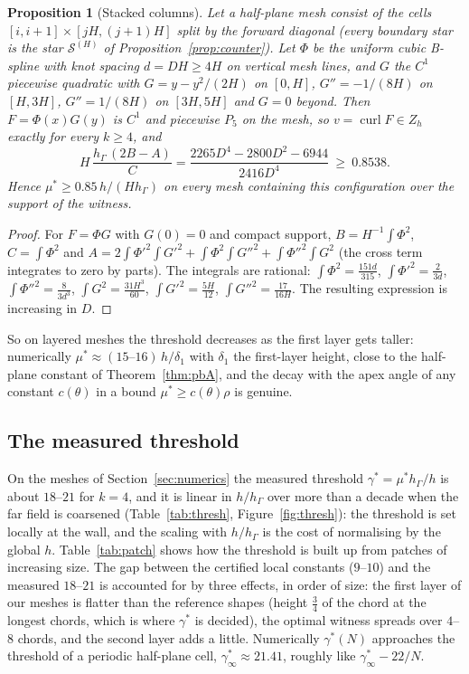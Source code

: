 \documentclass[pdflatex,sn-mathphys-num]{sn-jnl}
\theoremstyle{thmstyleone}
\newtheorem{proposition}[theorem]{Proposition}
\theoremstyle{thmstylethree}
\newcommand{\hG}{h_\Gamma}
\newcommand{\Zh}{Z_h}
\newcommand{\curl}{\operatorname{curl}}
\newcommand{\cS}{\mathcal S}
\begin{document}
\begin{proposition}[Stacked columns]\label{prop:cols}
Let a half-plane mesh consist of the cells $[i,i+1]\times[jH,(j+1)H]$ split by the forward diagonal (every boundary star is the star $\cS^{(H)}$ of Proposition~\ref{prop:counter}). Let $\Phi$ be the uniform cubic B-spline with knot spacing $d=DH\ge4H$ on vertical mesh lines, and $G$ the $C^1$ piecewise quadratic with $G=y-y^2/(2H)$ on $[0,H]$, $G''=-1/(8H)$ on $[H,3H]$, $G''=1/(8H)$ on $[3H,5H]$ and $G=0$ beyond. Then $F=\Phi(x)G(y)$ is $C^1$ and piecewise $P_5$ on the mesh, so $v=\curl F\in\Zh$ exactly for every $k\ge4$, and
\[
H\,\frac{\hG\,(2B-A)}{C}=\frac{2265D^4-2800D^2-6944}{2416D^4}\ \ge\ 0.8538 .
\]
Hence $\mu^\ast\ge0.85\,h/(H\hG)$ on every mesh containing this configuration over the support of the witness.
\end{proposition}

\begin{proof}
For $F=\Phi G$ with $G(0)=0$ and compact support, $B=H^{-1}\int\Phi^2$, $C=\int\Phi^2$ and $A=2\int\Phi'^2\int G'^2+\int\Phi^2\int G''^2+\int\Phi''^2\int G^2$ (the cross term integrates to zero by parts). The integrals are rational: $\int\Phi^2=\frac{151d}{315}$, $\int\Phi'^2=\frac2{3d}$, $\int\Phi''^2=\frac8{3d^3}$, $\int G^2=\frac{31H^3}{60}$, $\int G'^2=\frac{5H}{12}$, $\int G''^2=\frac{17}{16H}$. The resulting expression is increasing in $D$.
\end{proof}

So on layered meshes the threshold decreases as the first layer gets taller: numerically $\mu^\ast\approx(15\text{--}16)\,h/\delta_1$ with $\delta_1$ the first-layer height, close to the half-plane constant of Theorem~\ref{thm:pbA}, and the decay with the apex angle of any constant $c(\theta)$ in a bound $\mu^\ast\ge c(\theta)\rho$ is genuine.

\subsection{The measured threshold}
On the meshes of Section~\ref{sec:numerics} the measured threshold $\gamma^\ast=\mu^\ast\hG/h$ is about $18$--$21$ for $k=4$, and it is linear in $h/\hG$ over more than a decade when the far field is coarsened (Table~\ref{tab:thresh}, Figure~\ref{fig:thresh}): the threshold is set locally at the wall, and the scaling with $h/\hG$ is the cost of normalising by the global $h$. Table~\ref{tab:patch} shows how the threshold is built up from patches of increasing size. The gap between the certified local constants ($9$--$10$) and the measured $18$--$21$ is accounted for \cite{PadhiExt} by three effects, in order of size: the first layer of our meshes is flatter than the reference shapes (height $\frac34$ of the chord at the longest chords, which is where $\gamma^\ast$ is decided), the optimal witness spreads over $4$--$8$ chords, and the second layer adds a little. Numerically $\gamma^\ast(N)$ approaches the threshold of a periodic half-plane cell, $\gamma^\ast_\infty\approx21.41$, roughly like $\gamma^\ast_\infty-22/N$.
\end{document}
